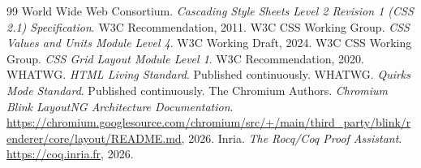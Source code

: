 \documentclass[11pt,a4paper]{article}
\theoremstyle{definition}
\begin{document}
\begin{thebibliography}{99}
 World Wide Web Consortium. \textit{Cascading Style Sheets Level 2 Revision 1 (CSS 2.1) Specification}. W3C Recommendation, 2011.
 W3C CSS Working Group. \textit{CSS Values and Units Module Level 4}. W3C Working Draft, 2024.
 W3C CSS Working Group. \textit{CSS Grid Layout Module Level 1}. W3C Recommendation, 2020.
 WHATWG. \textit{HTML Living Standard}. Published continuously.
 WHATWG. \textit{Quirks Mode Standard}. Published continuously.
 The Chromium Authors. \textit{Chromium Blink LayoutNG Architecture Documentation}. \url{https://chromium.googlesource.com/chromium/src/+/main/third_party/blink/renderer/core/layout/README.md}, 2026.
 Inria. \textit{The Rocq/Coq Proof Assistant}. \url{https://coq.inria.fr}, 2026.
\end{thebibliography}
\end{document}
